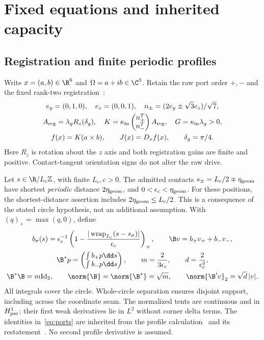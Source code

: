 \section{Fixed equations and inherited capacity}\label{sec:model}
\subsection{Registration and finite periodic profiles}
Write $x=(a,b)\in\R^6$ and $\Omega=a+ib\in\C^3$. Retain the raw port order $+,-$ and the fixed rank-two registration~\cite[Section 1]{p1}:
\begin{equation}\label{eq:registration}%
\begin{gathered}
e_y=(0,1,0),\quad e_z=(0,0,1),\quad
n_\pm=(2e_y\pm\sqrt3e_z)/\sqrt7,\\
A_{\rm reg}=\lambda_gR_z(\delta_g),\quad
K=\kappa_{\rm in}\begin{pmatrix}n_+^T\\n_-^T\end{pmatrix}A_{\rm reg},
\quad G=\kappa_{\rm in}\lambda_g>0,\\
f(x)=K(a\times b),\qquad J(x)=D_xf(x),\qquad \delta_g=\pi/4.
\end{gathered}
\end{equation}
Here $R_z$ is rotation about the $z$ axis and both registration gains are finite and positive. Contact-tangent orientation signs do not alter the raw drive.

Let $s\in\R/L_c\mathbb Z$, with finite $L_c,c>0$. The admitted contacts $s_\pm=L_c/2\mp\eta_{\rm geom}$ have shortest \emph{periodic} distance $2\eta_{\rm geom}$, and $0<\epsilon_c<\eta_{\rm geom}$. For these positions, the shortest-distance assertion includes $2\eta_{\rm geom}\le L_c/2$. This is a consequence of the stated circle hypothesis, not an additional assumption. With $(q)_+=\max(q,0)$, define
\begin{equation}\label{eq:ports}%
\begin{gathered}
b_\sigma(s)=\epsilon_c^{-1}
\left(1-\frac{|\operatorname{wrap}_{L_c}(s-s_\sigma)|}{\epsilon_c}\right)_+,
\qquad \B v=b_+v_++b_-v_-,\\
\B^*p=\begin{pmatrix}\int b_+p\dd s\\ \int b_-p\dd s\end{pmatrix},
\qquad m=\frac2{3\epsilon_c},\qquad d=\frac2{\epsilon_c^3},\\
\B^*\B=m\mathrm{Id}_2,\qquad
\norm{\B}=\norm{\B^*}=\sqrt m,\qquad
\norm{\B'v}_2=\sqrt d\,|v|.
\end{gathered}
\end{equation}
All integrals cover the circle. Whole-circle separation ensures disjoint support, including across the coordinate seam. The normalized tents are continuous and in $H^1_{\rm per}$; their first weak derivatives lie in $L^2$ without corner delta terms. The identities in~\eqref{eq:ports} are inherited from the profile calculation~\cite[Section 3]{p1} and its restatement~\cite[Section 2.1, (2.2)]{p3}. No second profile derivative is assumed.


